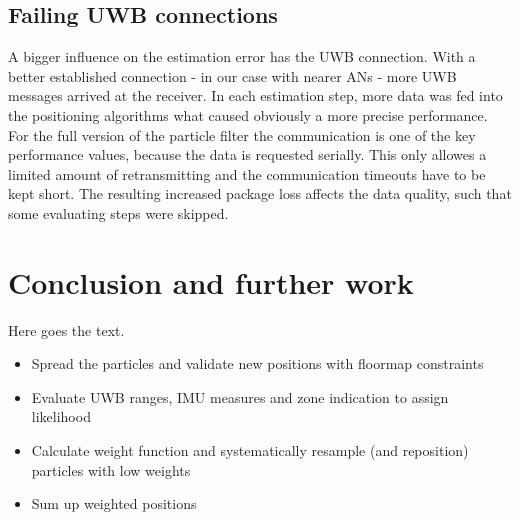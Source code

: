 \subsection{Failing UWB connections}
A bigger influence on the estimation error has the UWB connection. With a better established connection - in our case with nearer ANs - more UWB messages arrived at the receiver. In each estimation step, more data was fed into the positioning algorithms what caused obviously a more precise performance. For the full version of the particle filter the communication is one of the key performance values, because the data is requested serially. This only allowes a limited amount of retransmitting and the communication timeouts have to be kept short. The resulting increased package loss affects the data quality,  such that some evaluating steps were skipped. 




\section{Conclusion and further work}
Here goes the text.
\begin{itemize}
\item Spread the particles and validate new positions with floormap constraints
\item Evaluate UWB ranges, IMU measures and zone indication to assign likelihood
\item Calculate weight function and systematically resample (and reposition) particles with low weights
\item Sum up weighted positions
\end{itemize}
